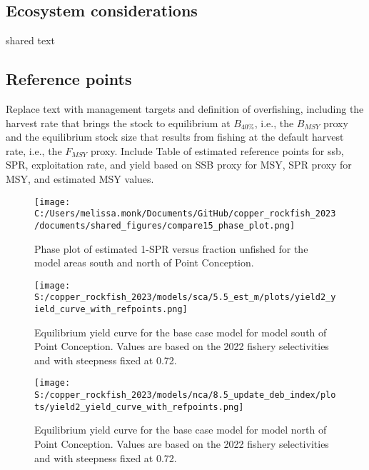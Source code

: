 \documentclass[11pt,
  english,
  letterpaper,
]{article}
\begin{document}
\hypertarget{ecosystem-considerations}{%
\subsection*{Ecosystem considerations}\label{ecosystem-considerations}}

shared text

\hypertarget{reference-points}{%
\subsection*{Reference points}\label{reference-points}}

Replace text with management targets and definition of overfishing, including the harvest rate that brings the stock to equilibrium at \(B_{40\%}\), i.e., the \(B_{MSY}\) proxy and the equilibrium stock size that results from fishing at the default harvest rate, i.e., the \(F_{MSY}\) proxy. Include Table of estimated reference points for ssb, SPR, exploitation rate, and yield based on SSB proxy for MSY, SPR proxy for MSY, and estimated MSY values.





\begin{figure}
\centering
\texttt{[image: C:/Users/melissa.monk/Documents/GitHub/copper\_rockfish\_2023/documents/shared\_figures/compare15\_phase\_plot.png]}
\caption{Phase plot of estimated 1-SPR versus fraction unfished for the model areas south and north of Point Conception.\label{fig:es-phase}}
\end{figure}

\begin{figure}
\centering
\texttt{[image: S:/copper\_rockfish\_2023/models/sca/5.5\_est\_m/plots/yield2\_yield\_curve\_with\_refpoints.png]}
\caption{Equilibrium yield curve for the base case model for model south of Point Conception. Values are based on the 2022 fishery selectivities and with steepness fixed at 0.72.\label{fig:south-es-yield}}
\end{figure}

\begin{figure}
\centering
\texttt{[image: S:/copper\_rockfish\_2023/models/nca/8.5\_update\_deb\_index/plots/yield2\_yield\_curve\_with\_refpoints.png]}
\caption{Equilibrium yield curve for the base case model for model north of Point Conception. Values are based on the 2022 fishery selectivities and with steepness fixed at 0.72.\label{fig:north-es-yield}}
\end{figure}
\end{document}
